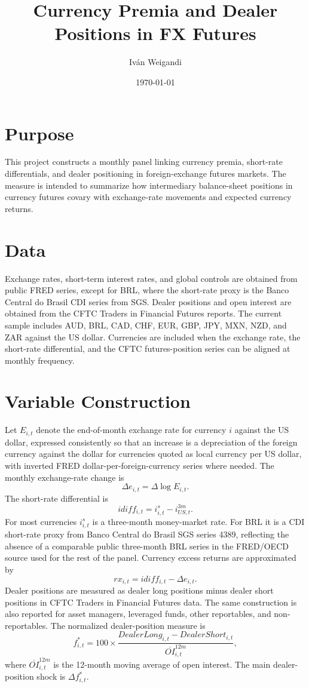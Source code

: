 \documentclass[11pt]{article}
\title{Currency Premia and Dealer Positions in FX Futures}
\author{Iv\'an Weigandi}
\date{\today}
\begin{document}
\maketitle

\section{Purpose}
This project constructs a monthly panel linking currency premia, short-rate differentials, and dealer positioning in foreign-exchange futures markets. The measure is intended to summarize how intermediary balance-sheet positions in currency futures covary with exchange-rate movements and expected currency returns.

\section{Data}
Exchange rates, short-term interest rates, and global controls are obtained from public FRED series, except for BRL, where the short-rate proxy is the Banco Central do Brasil CDI series from SGS. Dealer positions and open interest are obtained from the CFTC Traders in Financial Futures reports. The current sample includes AUD, BRL, CAD, CHF, EUR, GBP, JPY, MXN, NZD, and ZAR against the US dollar. Currencies are included when the exchange rate, the short-rate differential, and the CFTC futures-position series can be aligned at monthly frequency.

\section{Variable Construction}
Let $E_{i,t}$ denote the end-of-month exchange rate for currency $i$ against the US dollar, expressed consistently so that an increase is a depreciation of the foreign currency against the dollar for currencies quoted as local currency per US dollar, with inverted FRED dollar-per-foreign-currency series where needed. The monthly exchange-rate change is
\[
\Delta e_{i,t}=\Delta \log E_{i,t}.
\]
The short-rate differential is
\[
idiff_{i,t}=i_{i,t}^{s}-i_{US,t}^{3m}.
\]
For most currencies $i_{i,t}^{s}$ is a three-month money-market rate. For BRL it is a CDI short-rate proxy from Banco Central do Brasil SGS series 4389, reflecting the absence of a comparable public three-month BRL series in the FRED/OECD source used for the rest of the panel.
Currency excess returns are approximated by
\[
rx_{i,t}=idiff_{i,t}-\Delta e_{i,t}.
\]
Dealer positions are measured as dealer long positions minus dealer short positions in CFTC Traders in Financial Futures data. The same construction is also reported for asset managers, leveraged funds, other reportables, and non-reportables. The normalized dealer-position measure is
\[
f^*_{i,t}=100\times\frac{DealerLong_{i,t}-DealerShort_{i,t}}{\overline{OI}_{i,t}^{12m}},
\]
where $\overline{OI}_{i,t}^{12m}$ is the 12-month moving average of open interest. The main dealer-position shock is $\Delta f^*_{i,t}$.
\end{document}
